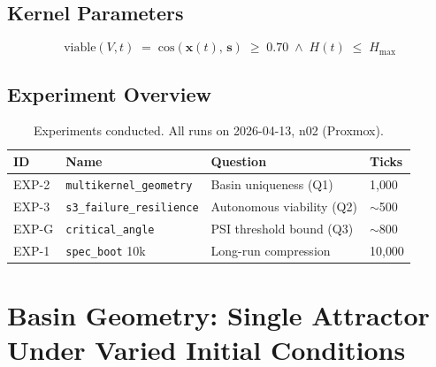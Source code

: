 \documentclass[11pt, a4paper]{article}
\newcommand{\stasis}{\bm{s}}
\newcommand{\sv}{\bm{x}}
\newcommand{\cosim}[2]{\mathrm{cos}\!\left(#1,\, #2\right)}
\begin{document}
\subsection{Kernel Parameters}
\label{sec:params}

%
\begin{equation}
  \mathrm{viable}(V,t) \;=\; \cosim{\sv(t)}{\stasis} \;\geq\; 0.70
  \;\wedge\; H(t) \;\leq\; H_{\max}
  \label{eq:viable}
\end{equation}

\subsection{Experiment Overview}
\label{sec:experiments_overview}

\begin{table}[h]
\centering
\caption{Experiments conducted. All runs on 2026-04-13, n02 (Proxmox).}
\label{tab:experiments}
\begin{tabular}{llll}
\toprule
\textbf{ID} & \textbf{Name} & \textbf{Question} & \textbf{Ticks} \\
\midrule
EXP-2   & \texttt{multikernel\_geometry}   & Basin uniqueness (Q1)        & 1{,}000 \\
EXP-3   & \texttt{s3\_failure\_resilience} & Autonomous viability (Q2)    & $\sim$500 \\
EXP-G   & \texttt{critical\_angle}         & PSI threshold bound (Q3)     & $\sim$800 \\
EXP-1   & \texttt{spec\_boot} 10k          & Long-run compression         & 10{,}000 \\
\bottomrule
\end{tabular}
\end{table}

\section{Basin Geometry: Single Attractor Under Varied Initial Conditions}
\label{sec:basin}

%
%
\end{document}

